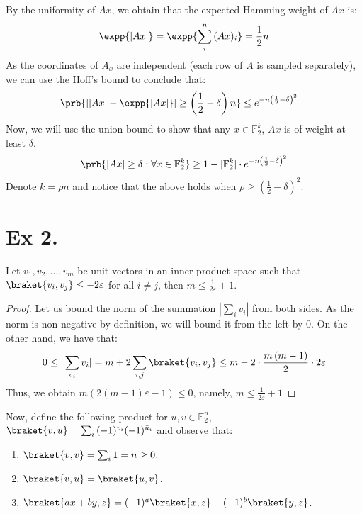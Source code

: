 \documentclass{article}
\newcommand{\FF}{\mathbb{F}}
\begin{document}
By the uniformity of $Ax$, we obtain that the expected Hamming weight of $Ax$ is: 
\begin{equation*}
  \begin{split}
    \expp{|Ax| } = \expp{\sum_{i}^{n}{(Ax)_{i}}} = \frac{1}{2} n    
  \end{split}
\end{equation*} 
As the coordinates of $A_{x}$ are independent (each row of $A$ is sampled separately), we can use the Hoff's bound to conclude that: 
\begin{equation*}
  \begin{split}
    \prb{| |Ax| - \expp{|Ax|}| \ge \left(\frac{1}{2} - \delta \right) n } & \le e^{-n \left(\frac{1}{2} - \delta \right)^{2} } 
  \end{split}
\end{equation*}
Now, we will use the union bound to show that any $x \in \FF_{2}^{k}$, $Ax$ is of weight at least $\delta$.  
\begin{equation*}
  \begin{split}
    \prb{|Ax| \ge \delta : \forall x \in \FF_{2}^{k} } \ge 1 - |\FF_{2}^{k}| \cdot e^{-n \left(\frac{1}{2} - \delta \right)^{2} } 
  \end{split}
\end{equation*}
Denote $k = \rho n$ and notice that the above holds when $\rho \ge \left(\frac{1}{2} - \delta \right)^{2} $.  

\section{Ex 2.}
\begin{claim}
  Let $v_{1},v_{2}, \dots, v_{m}$ be unit vectors in an inner-product space such that  $\braket{v_{i}, v_{j}} \le -2\varepsilon $ for all $i\neq j$, then $m \le \frac{1}{2\varepsilon}+1$.
\end{claim}
\begin{proof}
  Let us bound the norm of the summation $|\sum_{i}{v_{i}}|$ from both sides. As the norm is non-negative by definition, we will bound it from the left by $0$. On the other hand, we have that: 
  \begin{equation*}
    \begin{split}
      0 \le |\sum_{v_{i}}{v_{i}}| = m + 2\sum_{i,j}{\braket{v_{i},v_{j}}} \le m - 2 \cdot \frac{m\left( m-1 \right)}{2} \cdot 2\varepsilon  
    \end{split}
  \end{equation*}
  Thus, we obtain $ m\left( 2(m-1)\varepsilon - 1  \right) \le 0 $, namely, $m \le \frac{1}{2\varepsilon} + 1$   
\end{proof}
Now, define the following product for $u,v \in \FF_{2}^{n} $, $\braket{v,u} = \sum_{i}{ (-1)^{v_{i}} (-1)^{\bar{u}_{i}}  }$ and observe that: 
\begin{enumerate}
  \item $\braket{v,v} = \sum_{i}{ 1  } = n \ge 0 $.
  \item $\braket{v,u} = \braket{u,v}$.
  \item $\braket{ax + by,z} = (-1)^{a}\braket{x,z} + (-1)^{b}\braket{y,z}$. 
\end{enumerate}
\end{document}
